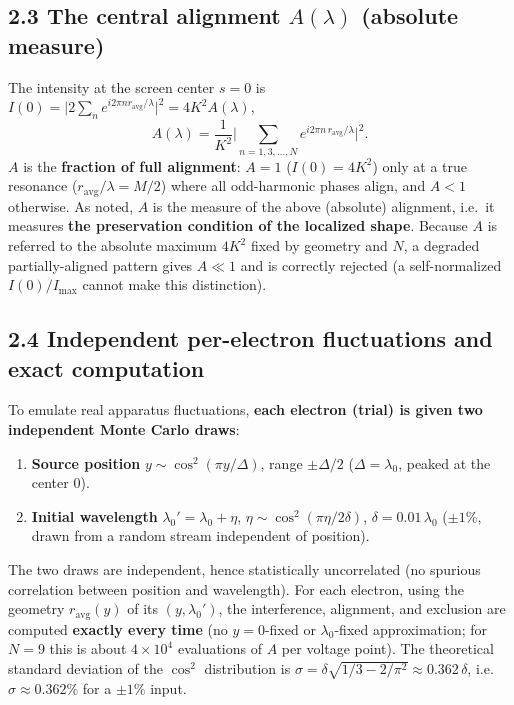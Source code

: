 \documentclass[11pt,a4paper]{article}
\providecommand{\tightlist}{\setlength{\itemsep}{0pt}\setlength{\parskip}{0pt}}
\begin{document}
\subsection{\texorpdfstring{2.3 The central alignment \(A(\lambda)\)
(absolute
measure)}{2.3 The central alignment A(\textbackslash lambda) (absolute measure)}}\label{the-central-alignment-alambda-absolute-measure}

The intensity at the screen center \(s=0\) is
\(I(0)=\big|2\sum_n e^{i2\pi n r_{\mathrm{avg}}/\lambda}\big|^2=4K^2A(\lambda)\),
\[A(\lambda)=\frac{1}{K^2}\Big|\sum_{n=1,3,\dots,N}e^{i2\pi n\,r_{\mathrm{avg}}/\lambda}\Big|^2.\]
\(A\) is the \textbf{fraction of full alignment}: \(A=1\)
(\(I(0)=4K^2\)) only at a true resonance
(\(r_{\mathrm{avg}}/\lambda=M/2\)) where all odd-harmonic phases align,
and \(A<1\) otherwise. As noted, \(A\) is the measure of the above
(absolute) alignment, i.e.~it measures \textbf{the preservation
condition of the localized shape}. Because \(A\) is referred to the
absolute maximum \(4K^2\) fixed by geometry and \(N\), a degraded
partially-aligned pattern gives \(A\ll1\) and is correctly rejected (a
self-normalized \(I(0)/I_{\max}\) cannot make this distinction).

\subsection{2.4 Independent per-electron fluctuations and exact
computation}\label{independent-per-electron-fluctuations-and-exact-computation}

To emulate real apparatus fluctuations, \textbf{each electron (trial) is
given two independent Monte Carlo draws}:

\begin{enumerate}
\def\labelenumi{\arabic{enumi}.}
\tightlist
\item
  \textbf{Source position} \(y\sim\cos^2(\pi y/\Delta)\), range
  \(\pm\Delta/2\) (\(\Delta=\lambda_0\), peaked at the center \(0\)).
\item
  \textbf{Initial wavelength} \(\lambda_0'=\lambda_0+\eta\),
  \(\eta\sim\cos^2(\pi\eta/2\delta)\), \(\delta=0.01\,\lambda_0\)
  (\(\pm1\%\), drawn from a random stream independent of position).
\end{enumerate}

The two draws are independent, hence statistically uncorrelated (no
spurious correlation between position and wavelength). For each
electron, using the geometry \(r_{\mathrm{avg}}(y)\) of its
\((y,\lambda_0')\), the interference, alignment, and exclusion are
computed \textbf{exactly every time} (no \(y=0\)-fixed or
\(\lambda_0\)-fixed approximation; for \(N=9\) this is about
\(4\times10^4\) evaluations of \(A\) per voltage point). The theoretical
standard deviation of the \(\cos^2\) distribution is
\(\sigma=\delta\sqrt{1/3-2/\pi^2}\approx0.362\,\delta\),
i.e.~\textbf{\(\sigma\approx0.362\%\)} for a \(\pm1\%\) input.
\end{document}
